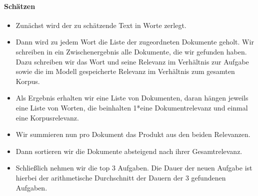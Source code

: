 \paragraph{Schätzen}

\begin{itemize}
        \tightlist
        \item Zunächst wird der zu schätzende Text in Worte zerlegt.
        \item Dann wird zu jedem Wort die Liste der zugeordneten Dokumente geholt. Wir schreiben in ein Zwischenergebnis alle Dokumente, die wir gefunden haben. Dazu schreiben wir das Wort und seine Relevanz im Verhältnis zur Aufgabe sowie die im Modell gespeicherte Relevanz im Verhältnis zum gesamten Korpus.
        \item Als Ergebnis erhalten wir eine Liste von Dokumenten, daran hängen jeweils eine Liste von Worten, die beinhalten 1*eine Dokumentrelevanz und einmal eine Korpusrelevanz.
        \item Wir summieren nun pro Dokument das Produkt aus den beiden Relevanzen.
        \item Dann sortieren wir die Dokumente absteigend nach ihrer Gesamtrelevanz.
        \item Schließlich nehmen wir die top 3 Aufgaben. Die Dauer der neuen Aufgabe ist hierbei der arithmetische Durchschnitt der Dauern der 3 gefundenen Aufgaben.
\end{itemize}



